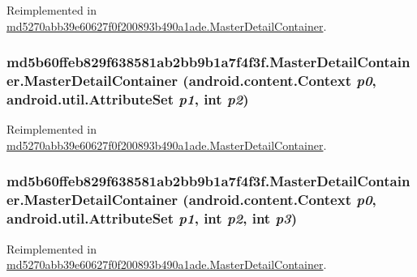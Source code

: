 Reimplemented in \hyperlink{classmd5270abb39e60627f0f200893b490a1ade_1_1_master_detail_container_c1707155566739333160760c52523d93}{md5270abb39e60627f0f200893b490a1ade.MasterDetailContainer}.\hypertarget{classmd5b60ffeb829f638581ab2bb9b1a7f4f3f_1_1_master_detail_container_3e752c4a1c463a622ff8574921b3c763}{
\subsubsection[{MasterDetailContainer}]{\setlength{\rightskip}{0pt plus 5cm}md5b60ffeb829f638581ab2bb9b1a7f4f3f.MasterDetailContainer.MasterDetailContainer (android.content.Context {\em p0}, \/  android.util.AttributeSet {\em p1}, \/  int {\em p2})}}
\label{classmd5b60ffeb829f638581ab2bb9b1a7f4f3f_1_1_master_detail_container_3e752c4a1c463a622ff8574921b3c763}




Reimplemented in \hyperlink{classmd5270abb39e60627f0f200893b490a1ade_1_1_master_detail_container_fe89442bed68567e1df7fa008310532a}{md5270abb39e60627f0f200893b490a1ade.MasterDetailContainer}.\hypertarget{classmd5b60ffeb829f638581ab2bb9b1a7f4f3f_1_1_master_detail_container_02e06b2d64b99adfc10ba2adc27242c9}{
\subsubsection[{MasterDetailContainer}]{\setlength{\rightskip}{0pt plus 5cm}md5b60ffeb829f638581ab2bb9b1a7f4f3f.MasterDetailContainer.MasterDetailContainer (android.content.Context {\em p0}, \/  android.util.AttributeSet {\em p1}, \/  int {\em p2}, \/  int {\em p3})}}
\label{classmd5b60ffeb829f638581ab2bb9b1a7f4f3f_1_1_master_detail_container_02e06b2d64b99adfc10ba2adc27242c9}




Reimplemented in \hyperlink{classmd5270abb39e60627f0f200893b490a1ade_1_1_master_detail_container_003d434348891f8f2e731962b72dd90a}{md5270abb39e60627f0f200893b490a1ade.MasterDetailContainer}.

